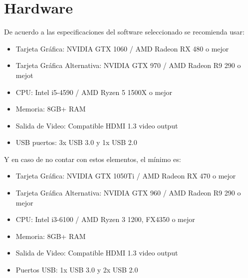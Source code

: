 \section{Hardware}
De acuerdo a las especificaciones del software seleccionado se recomienda usar:\\
\begin{itemize}
\item Tarjeta Gráfica: NVIDIA GTX 1060 / AMD Radeon RX 480 o mejor
\item Tarjeta Gráfica Alternativa: NVIDIA GTX 970 / AMD Radeon R9 290 o mejot
\item CPU: Intel i5-4590 / AMD Ryzen 5 1500X o mejor
\item Memoria: 8GB+ RAM
\item Salida de Video: Compatible HDMI 1.3 video output
\item USB puertos: 3x USB 3.0 y  1x USB 2.0
\end{itemize}
Y en caso de no contar con estos elementos, el mínimo es:
\begin{itemize}
\item Tarjeta Gráfica: NVIDIA GTX 1050Ti / AMD Radeon RX 470 o mejor
\item Tarjeta Gráfica Alternativa: NVIDIA GTX 960 / AMD Radeon R9 290 o mejor
\item CPU: Intel i3-6100 / AMD Ryzen 3 1200, FX4350 o mejor
\item Memoria: 8GB+ RAM
\item Salida de Video: Compatible HDMI 1.3 video output
\item Puertos USB: 1x USB 3.0 y 2x USB 2.0
\end{itemize} 

